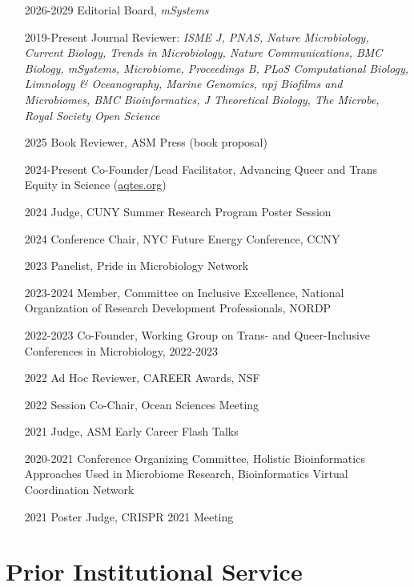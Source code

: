 \documentclass[]{res}
\begin{document}
\begin{resume}
\begin{itemize}
\item[2026-2029] {Editorial Board,} \emph{mSystems}
\item[2019-Present] {Journal Reviewer:} \emph{ISME J, PNAS, Nature Microbiology, Current Biology, Trends in Microbiology, Nature Communications, BMC Biology, mSystems, Microbiome, Proceedings B, PLoS Computational Biology, Limnology \& Oceanography, Marine Genomics, npj Biofilms and Microbiomes, BMC Bioinformatics, J Theoretical Biology, The Microbe, Royal Society Open Science}
\item[2025] {Book Reviewer,} ASM Press (book proposal)
\item[2024-Present] {Co-Founder/Lead Facilitator,} Advancing Queer and Trans Equity in Science (\url{aqtes.org})
\item[2024] {Judge,} CUNY Summer Research Program Poster Session
\item[2024] {Conference Chair,} NYC Future Energy Conference, CCNY
\item[2023] {Panelist,} Pride in Microbiology Network
\item[2023-2024] {Member,} Committee on Inclusive Excellence, National Organization of Research Development Professionals, NORDP
\item[2022-2023] {Co-Founder,} Working Group on Trans- and Queer-Inclusive Conferences in Microbiology, 2022-2023
\item[2022] {Ad Hoc Reviewer,} CAREER Awards, NSF
\item[2022] {Session Co-Chair,} {Ocean Sciences Meeting}
\item[2021] {Judge,} ASM Early Career Flash Talks
\item[2020-2021] {Conference Organizing Committee,} {Holistic Bioinformatics Approaches Used in Microbiome Research}, Bioinformatics Virtual Coordination Network
\item[2021] {Poster Judge,} {CRISPR 2021 Meeting}
\end{itemize}

\section{{Prior Institutional Service}} 


\end{resume}
\end{document}
